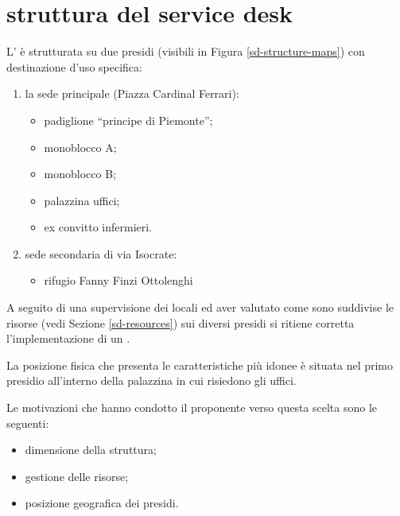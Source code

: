 %
%
\section[Struttura del Service Desk]{struttura del service desk}
\label{sd-structure}
L'\entity{} è strutturata su due presidi (visibili in Figura \ref{sd-structure-maps}) con destinazione d'uso specifica:

\begin{enumerate}
\item{la sede principale (Piazza Cardinal Ferrari):}
\begin{itemize}
\item{padiglione ``principe di Piemonte'';}
\item{monoblocco A;}
\item{monoblocco B;}
\item{palazzina uffici;}
\item{ex convitto infermieri.}
\end{itemize}
\item{sede secondaria di via Isocrate:}
\begin{itemize}
\item{rifugio Fanny Finzi Ottolenghi}
\end{itemize}
\end{enumerate}

A seguito di una supervisione dei locali ed aver valutato come sono suddivise le risorse (vedi Sezione \ref{sd-resources}) sui diversi presidi si ritiene corretta l'implementazione di un .

La posizione fisica che presenta le caratteristiche più idonee è situata nel primo presidio all'interno della palazzina in cui risiedono gli uffici.

Le motivazioni che hanno condotto il proponente verso questa scelta sono le seguenti:

\begin{itemize}
\item{dimensione della struttura;}
\item{gestione delle risorse;}
\item{posizione geografica dei presidi.}
\end{itemize}

